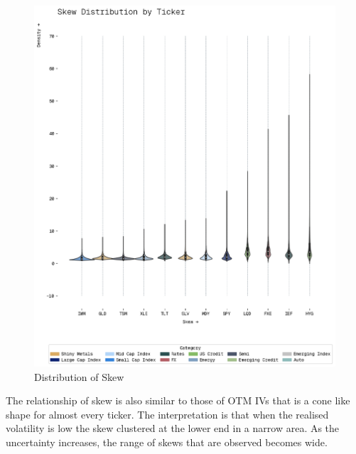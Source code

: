 \begin{figure}[H]
    \centering
    \includegraphics[width=1\textwidth]{images/skew_violin.png}
    \caption{Distribution of Skew}
    \label{fig:skew_violin}
\end{figure}

The relationship of skew is also similar to those of OTM IVs that is a cone like shape for almost every ticker. The interpretation is that when the realised volatility is low the skew clustered at the lower end in a narrow area. As the uncertainty increases, the range of skews that are observed becomes wide.

